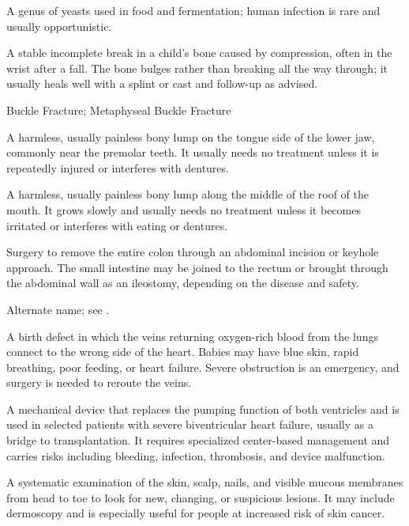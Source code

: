  A genus of yeasts used in food and fermentation; human infection is rare and usually opportunistic.

 A stable incomplete break in a child's bone caused by compression, often in the wrist after a fall. The bone bulges rather than breaking all the way through; it usually heals well with a splint or cast and follow-up as advised.

\synonyms
Buckle Fracture; Metaphyseal Buckle Fracture

 A harmless, usually painless bony lump on the tongue side of the lower jaw, commonly near the premolar teeth. It usually needs no treatment unless it is repeatedly injured or interferes with dentures.

 A harmless, usually painless bony lump along the middle of the roof of the mouth. It grows slowly and usually needs no treatment unless it becomes irritated or interferes with eating or dentures.

 Surgery to remove the entire colon through an abdominal incision or keyhole approach. The small intestine may be joined to the rectum or brought through the abdominal wall as an ileostomy, depending on the disease and safety.

 Alternate name; see .

 A birth defect in which the veins returning oxygen-rich blood from the lungs connect to the wrong side of the heart. Babies may have blue skin, rapid breathing, poor feeding, or heart failure. Severe obstruction is an emergency, and surgery is needed to reroute the veins.

 A mechanical device that replaces the pumping function of both ventricles and is used in selected patients with severe biventricular heart failure, usually as a bridge to transplantation. It requires specialized center-based management and carries risks including bleeding, infection, thrombosis, and device malfunction.

 A systematic examination of the skin, scalp, nails, and visible mucous membranes from head to toe to look for new, changing, or suspicious lesions. It may include dermoscopy and is especially useful for people at increased risk of skin cancer.

